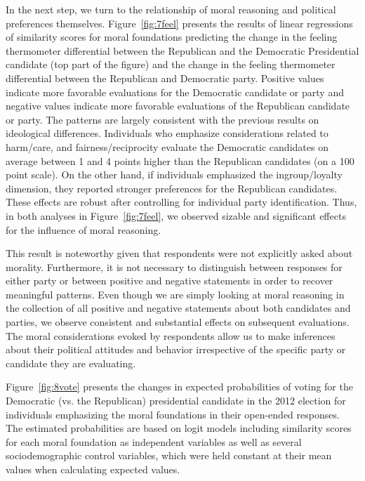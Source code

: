 \documentclass[12pt]{article}
\begin{document}
In the next step, we turn to the relationship of moral reasoning and political preferences themselves. Figure~\ref{fig:7feel} presents the results of linear regressions of similarity scores for moral foundations predicting the change in the feeling thermometer differential between the Republican and the Democratic Presidential candidate (top part of the figure) and the change in the feeling thermometer differential between the Republican and Democratic party. Positive values indicate more favorable evaluations for the Democratic candidate or party and negative values indicate more favorable evaluations of the Republican candidate or party. The patterns are largely consistent with the previous results on ideological differences. Individuals who emphasize considerations related to harm/care, and fairness/reciprocity evaluate the Democratic candidates on average between 1 and 4 points higher than the Republican candidates (on a 100 point scale). On the other hand, if individuals emphasized the ingroup/loyalty dimension, they reported stronger preferences for the Republican candidates. These effects are robust after controlling for individual party identification. Thus, in both analyses in Figure~\ref{fig:7feel}, we observed sizable and significant effects for the influence of moral reasoning.

This result is noteworthy given that respondents were not explicitly asked about morality. Furthermore, it is not necessary to distinguish between responses for either party or between positive and negative statements in order to recover meaningful patterns. Even though we are simply looking at moral reasoning in the collection of all positive and negative statements about both candidates and parties, we observe consistent and substantial effects on subsequent evaluations. The moral considerations evoked by respondents allow us to make inferences about their political attitudes and behavior irrespective of the specific party or candidate they are evaluating.

Figure~\ref{fig:8vote} presents the changes in expected probabilities of voting for the Democratic (vs. the Republican) presidential candidate in the 2012 election for individuals emphasizing the moral foundations in their open-ended responses. The estimated probabilities are based on logit models including similarity scores for each moral foundation as independent variables as well as several sociodemographic control variables, which were held constant at their mean values when calculating expected values.
\end{document}
